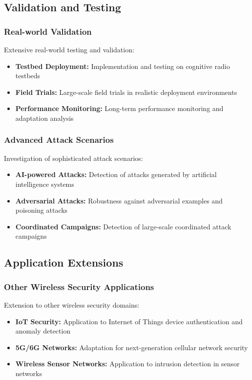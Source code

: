 \subsection{Validation and Testing}

\subsubsection{Real-world Validation}
Extensive real-world testing and validation:
\begin{itemize}
\item \textbf{Testbed Deployment:} Implementation and testing on cognitive radio testbeds
\item \textbf{Field Trials:} Large-scale field trials in realistic deployment environments
\item \textbf{Performance Monitoring:} Long-term performance monitoring and adaptation analysis
\end{itemize}

\subsubsection{Advanced Attack Scenarios}
Investigation of sophisticated attack scenarios:
\begin{itemize}
\item \textbf{AI-powered Attacks:} Detection of attacks generated by artificial intelligence systems
\item \textbf{Adversarial Attacks:} Robustness against adversarial examples and poisoning attacks
\item \textbf{Coordinated Campaigns:} Detection of large-scale coordinated attack campaigns
\end{itemize}

\subsection{Application Extensions}

\subsubsection{Other Wireless Security Applications}
Extension to other wireless security domains:
\begin{itemize}
\item \textbf{IoT Security:} Application to Internet of Things device authentication and anomaly detection
\item \textbf{5G/6G Networks:} Adaptation for next-generation cellular network security
\item \textbf{Wireless Sensor Networks:} Application to intrusion detection in sensor networks
\end{itemize}

